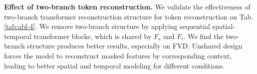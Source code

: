 \noindent \textbf{Effect of two-branch token reconstruction.}
We validate the effectiveness of two-branch transformer reconstruction structure for token reconstruction on Tab.\ref{tab:abl-4}. We remove two-branch structure by applying sequential spatial-temporal transformer blocks, which is shared by $F_s$ and $F_t$. 
We find the two-branch structure produces better results, especially on FVD. Unshared design forces the model to reconstruct masked features by corresponding context, leading to better spatial and temporal modeling for different conditions. 

% 
% 
% 
% 
% 
% 

